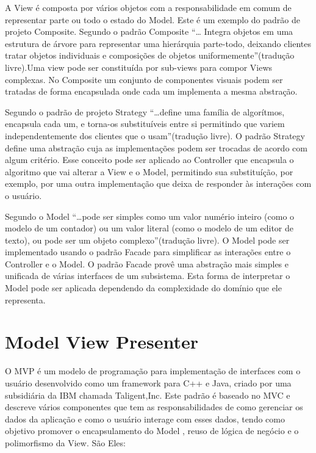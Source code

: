 A View é composta por vários objetos com a responsabilidade em comum de
representar parte ou todo o estado do Model. Este é um exemplo do padrão de
projeto Composite. Segundo  o padrão Composite ``\ldots
Integra objetos em uma estrutura de árvore para representar uma hierárquia
parte-todo, deixando clientes tratar objetos individuais e composições de
objetos uniformemente''(tradução livre).Uma view pode ser constituída por
sub-views para compor Views complexas. No Composite  um conjunto de componentes
visuais podem ser tratadas de forma encapsulada onde cada um implementa a
mesma abstração. 

Segundo  o padrão de projeto Strategy ``\ldots define uma
família de algorítmos, encapsula cada um, e torna-os substituíveis entre si
permitindo que variem independentemente dos clientes que o usam''(tradução
livre). O padrão Strategy define uma abstração cuja as implementações podem ser
trocadas de acordo com algum critério. Esse conceito pode ser aplicado ao
Controller que encapsula o algoritmo que vai alterar a View e o Model,
permitindo sua substituíção, por exemplo, por uma outra implementação que deixa
de responder às interações com o usuário.

Segundo  o Model ``\ldots pode ser simples como
um valor numério inteiro (como o modelo de um contador) ou um valor literal
(como o modelo de um editor de texto), ou pode ser um objeto complexo''(tradução
livre). O Model pode ser implementado usando o padrão Facade para simplificar
as interações entre o Controller e o Model. O padrão Facade provê
uma abstração mais simples e unificada de várias interfaces de um
subsistema\cite{gof}. Esta forma de interpretar o Model pode ser aplicada
dependendo da complexidade do domínio que ele representa.

\section{Model View Presenter}

O MVP é um modelo de programação para implementação de interfaces com o usuário
desenvolvido como um framework para C++ e Java, criado por uma subsidiária da
IBM chamada Taligent,Inc. Este padrão é baseado no MVC e descreve vários
componentes que tem as responsabilidades de como gerenciar os dados da aplicação
e como o usuário interage com esses dados, tendo como objetivo promover o
encapsulamento do Model , reuso de lógica de negócio e o polimorfismo da View.
São Eles:

